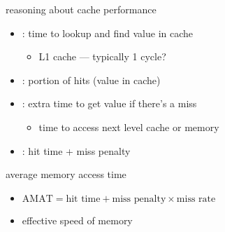 \begin{frame}{reasoning about cache performance}
    \begin{itemize}
        \item {}: time to lookup and find value in cache
        \begin{itemize}
        \item L1 cache --- typically 1 cycle?
        \end{itemize}
    \item {}: portion of hits (value in cache)
    \item {}: extra time to get value if there's a miss
        \begin{itemize}
        \item time to access next level cache or memory
        \end{itemize}
    \item {}: hit time + miss penalty
    \end{itemize}
\end{frame}

\begin{frame}{average memory access time}
    \begin{itemize}
    \item $\text{AMAT} = \text{hit time} + \text{miss penalty} \times \text{miss rate}$
    \item effective speed of memory
    \end{itemize}
\end{frame}
